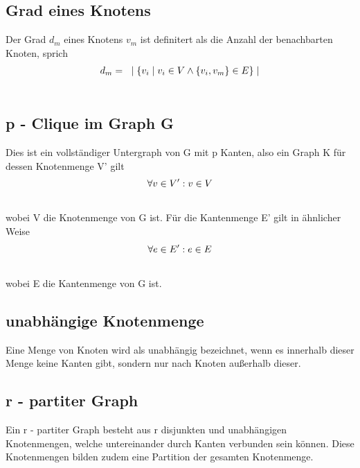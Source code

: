 \documentclass[12pt, a4paper]{article}
\begin{document}
\subsection{Grad eines Knotens}
\label{theorem:grad-eines-knotens}
Der Grad $d_m$ eines Knotens $v_m$ ist definitert als die Anzahl der benachbarten Knoten, sprich
\begin{gather}
\begin{split}d_m = \text{  } \mid \{ v_i \mid v_i \in V \wedge \{ v_i, v_m \} \in E \} \mid\end{split}\notag\\\begin{split}\end{split}\notag
\end{gather}

\subsection{p - Clique im Graph G}
\label{theorem:p-clique-im-graph-g}
Dies ist ein vollständiger Untergraph von G mit p Kanten, also ein Graph K für dessen Knotenmenge V' gilt
\begin{gather}
\begin{split}\forall v \in V': v \in V\end{split}\notag\\\begin{split}\end{split}\notag
\end{gather}
wobei V die Knotenmenge von G ist. Für die Kantenmenge E' gilt in ähnlicher Weise
\begin{gather}
\begin{split}\forall e \in E': e \in E\end{split}\notag\\\begin{split}\end{split}\notag
\end{gather}
wobei E die Kantenmenge von G ist.


\subsection{unabhängige Knotenmenge}
\label{theorem:unabhangige-knotenmenge}
Eine Menge von Knoten wird als unabhängig bezeichnet, wenn es innerhalb dieser Menge keine Kanten gibt, sondern nur nach Knoten außerhalb dieser.


\subsection{r - partiter Graph}
\label{theorem:r-partiter-graph}
Ein r - partiter Graph besteht aus r disjunkten und unabhängigen Knotenmengen, welche untereinander durch Kanten verbunden sein können. Diese Knotenmengen bilden zudem eine Partition der gesamten Knotenmenge.
\end{document}
